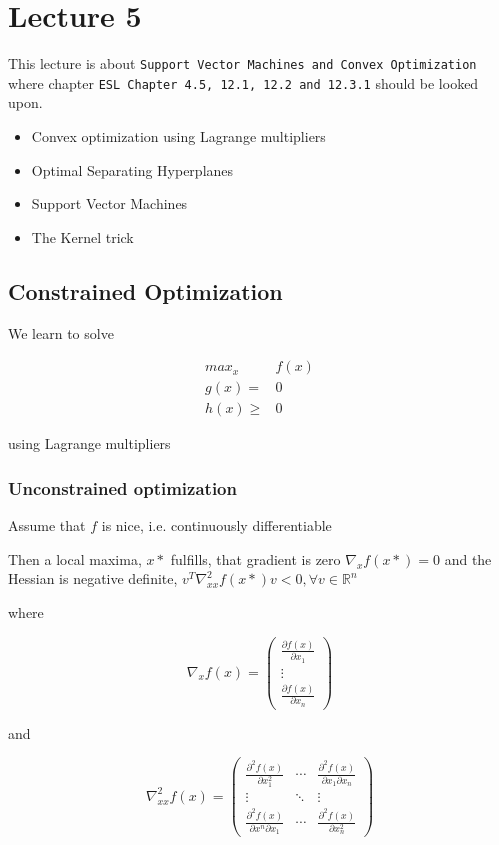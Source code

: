 \chapter{Lecture 5}

This lecture is about \texttt{Support Vector Machines and Convex
Optimization} where chapter \texttt{ESL Chapter 4.5, 12.1,
12.2 and 12.3.1} should be looked upon.

\begin{itemize}
  \item Convex optimization using Lagrange multipliers
  \item Optimal Separating Hyperplanes
  \item Support Vector Machines
  \item The Kernel trick
\end{itemize}

\section{Constrained Optimization}

We learn to solve

\begin{align}
  max_x & f(x) \\
  g(x) =  & 0 \\
  h(x) \geq & 0
\end{align}

using Lagrange multipliers

\subsection{Unconstrained optimization}

Assume that $f$ is nice, i.e. continuously differentiable

Then a local maxima, $x*$ fulfills, that gradient is zero $\nabla_x f(x*) = 0$ and the Hessian is negative definite, $v^T \nabla^2_{xx} f(x*) v < 0, \forall v \in \mathbb{R}^n$

where

\[
    \nabla_x f(x) = \left(
    \begin{array}{c}
      \frac{\partial f(x)}{\partial x_1} \\
      \vdots \\
      \frac{\partial f(x)}{\partial x_n}
    \end{array}\right)
\]

and

\[
    \nabla_{xx}^2 f(x) = \left(
    \begin{array}{ccc}
      \frac{\partial^2 f(x)}{\partial x^2_1} & \cdots & \frac{\partial^2 f(x)}{\partial x_1 \partial x_n} \\
      \vdots & \ddots & \vdots \\
      \frac{\partial^2 f(x)}{\partial x^n \partial x_1} & \cdots & \frac{\partial^2 f(x)}{\partial x^2_n}
    \end{array} \right)
\]

